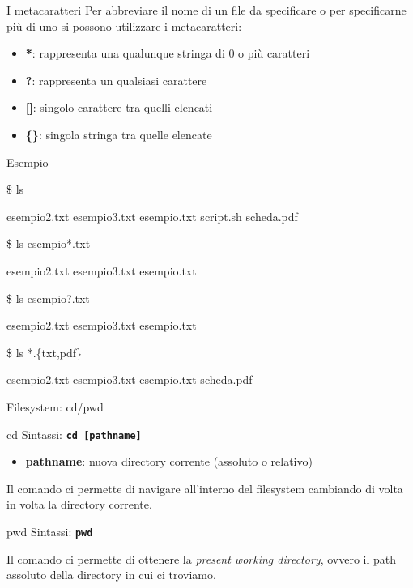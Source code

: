 \documentclass{beamer}
\begin{document}
    \begin{frame}{I metacaratteri}
        Per abbreviare il nome di un file da specificare o per specificarne più di uno
        si possono utilizzare i metacaratteri:
        \begin{itemize}
            \item \textbf{*}: rappresenta una qualunque stringa di 0 o più caratteri
            \item \textbf{?}: rappresenta un qualsiasi carattere
            \item \textbf{[]}: singolo carattere tra quelli elencati
            \item \textbf{\{\}}: singola stringa tra quelle elencate
        \end{itemize}
        \begin{exampleblock}{Esempio}
            \footnotesize

            \$ ls

            esempio2.txt esempio3.txt esempio.txt script.sh scheda.pdf

            \vspace{0.25cm}

            \$ ls esempio*.txt

            esempio2.txt esempio3.txt esempio.txt

            \vspace{0.25cm}

            \$ ls esempio?.txt

            esempio2.txt esempio3.txt esempio.txt

            \vspace{0.25cm}

            \$ ls *.\{txt,pdf\}

            esempio2.txt esempio3.txt esempio.txt scheda.pdf
        \end{exampleblock}
    \end{frame}

    \begin{frame}{Filesystem: cd/pwd}
        \begin{block}{cd}
            Sintassi: \texttt{\textbf{cd [pathname]}}
            
            \begin{itemize}
                \item \textbf{pathname}: nuova directory corrente (assoluto o relativo)
            \end{itemize}

            Il comando ci permette di navigare all'interno del
            filesystem cambiando di volta in volta la directory corrente.
        \end{block}

        \begin{block}{pwd}
            Sintassi: \texttt{\textbf{pwd}}

            Il comando ci permette di ottenere la \textit{present working directory}, ovvero il path assoluto
            della directory in cui ci troviamo.
        \end{block}
    \end{frame}
\end{document}
